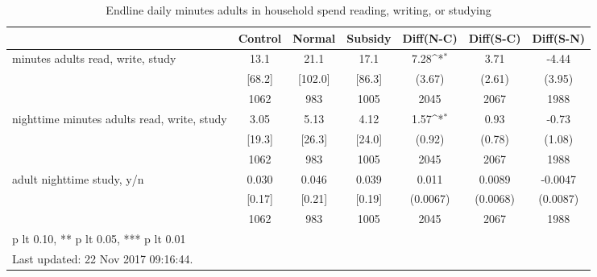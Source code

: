 \begin{table}[htbp]\centering
\def\sym#1{\ifmmode^{#1}\else\(^{#1}\)\fi}
\caption{Endline daily minutes adults in household spend reading, writing, or studying \label{tab:"balance"}}
\begin{tabular*}{1\hsize}{@{\hskip\tabcolsep\extracolsep\fill}l*{1}{cccccc}}
\toprule
                                &  Control&   Normal&  Subsidy&Diff(N-C)         &Diff(S-C)         &Diff(S-N)         \\
\midrule
minutes adults read, write, study&     13.1&     21.1&     17.1&     7.28\sym{*}  &     3.71         &    -4.44         \\
                                &   [68.2]&  [102.0]&   [86.3]&   (3.67)         &   (2.61)         &   (3.95)         \\
                                &     1062&      983&     1005&     2045         &     2067         &     1988         \\
nighttime minutes adults read, write, study&     3.05&     5.13&     4.12&     1.57\sym{*}  &     0.93         &    -0.73         \\
                                &   [19.3]&   [26.3]&   [24.0]&   (0.92)         &   (0.78)         &   (1.08)         \\
                                &     1062&      983&     1005&     2045         &     2067         &     1988         \\
adult nighttime study, y/n      &    0.030&    0.046&    0.039&    0.011         &   0.0089         &  -0.0047         \\
                                &   [0.17]&   [0.21]&   [0.19]& (0.0067)         & (0.0068)         & (0.0087)         \\
                                &     1062&      983&     1005&     2045         &     2067         &     1988         \\
\bottomrule
\multicolumn{7}{l}{\footnotesize * p lt 0.10, ** p lt 0.05, *** p lt 0.01}\\
\multicolumn{7}{l}{\footnotesize Last updated: 22 Nov 2017 09:16:44.}\\
\end{tabular*}
\end{table}
